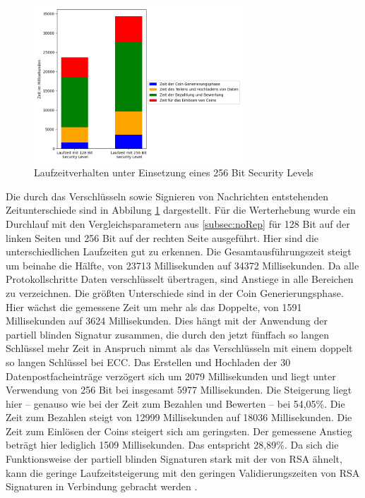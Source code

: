 \documentclass[
	fontsize=11pt,
	headings=small,
	parskip=half,           %
	bibliography=totoc,
	numbers=noenddot,       %
	open=any,               %
]{scrreprt}
\begin{document}
\begin{figure}[h]
    \caption{Laufzeitverhalten unter Einsetzung eines 256 Bit Security Levels}
    \label{fig:win_256bit}
    \centering
    \includegraphics[width=0.7\textwidth]{figure_win_256Bit.png}
\end{figure}
Die durch das Verschlüsseln sowie Signieren von Nachrichten entstehenden Zeitunterschiede sind in Abbilung \ref{fig:win_256bit} dargestellt. Für die Werterhebung wurde ein Durchlauf mit den Vergleichsparametern aus \ref{subsec:noRep} für 128 Bit auf der linken Seiten und 256 Bit auf der rechten Seite ausgeführt. Hier sind die unterschiedlichen Laufzeiten gut zu erkennen. Die Gesamtausführungszeit steigt um beinahe die Hälfte, von 23713 Millisekunden auf 34372 Millisekunden. Da alle Protokollschritte Daten verschlüsselt übertragen, sind Anstiege in alle Bereichen zu verzeichnen. Die größten Unterschiede sind in der Coin Generierungsphase. Hier wächst die gemessene Zeit um mehr als das Doppelte, von 1591 Millisekunden auf 3624 Millisekunden. Dies hängt mit der Anwendung der partiell blinden Signatur zusammen, die durch den jetzt fünffach so langen Schlüssel mehr Zeit in Anspruch nimmt als das Verschlüsseln mit einem doppelt so langen Schlüssel bei ECC. Das Erstellen und Hochladen der 30 Datenpostfacheinträge verzögert sich um 2079 Millisekunden und liegt unter Verwendung von 256 Bit bei insgesamt 5977 Millisekunden. Die Steigerung liegt hier -- genauso wie bei der Zeit zum Bezahlen und Bewerten -- bei 54,05\%. Die Zeit zum Bezahlen steigt von 12999 Millisekunden auf 18036 Millisekunden.  Die Zeit zum Einlösen der Coins steigert sich am geringsten. Der gemessene Anstieg beträgt hier lediglich 1509 Millisekunden. Das entspricht 28,89\%. Da sich die Funktionsweise der partiell blinden Signaturen stark mit der von RSA ähnelt, kann die geringe Laufzeitsteigerung mit den geringen Validierungszeiten von RSA Signaturen in Verbindung gebracht werden \cite{rsa-Singh2016Performance}.
\end{document}
